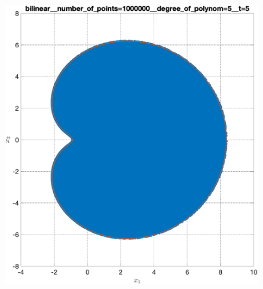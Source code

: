 \documentclass[../main.tex]{subfiles}
\begin{document}
\begin{figure}[ht!]
\begin{minipage}[b]{.3\linewidth}
 	\end{minipage}
 	\vfill
 	\hspace{-2.5ex}
 	\begin{minipage}[b]{.3\linewidth} 
 		\small
 		\centering
 		\includegraphics[width=\linewidth]{images/bilinear__number_of_points=1000000__degree_of_polynom=5__t=5.eps}
 	\end{minipage} 
 	\hfill
 	\begin{minipage}[b]{.3\linewidth} 
 		\small
 		\centering 

\end{minipage}
\end{figure}
\end{document}
